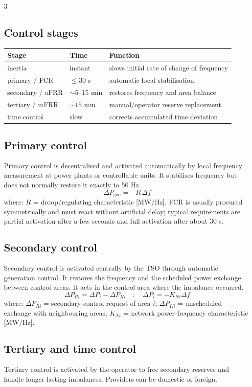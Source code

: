 \documentclass[9pt, landscape, a4paper]{article}
\begin{document}
\begin{multicols*}{3}
\subsection{Control stages}
\begin{tabularx}{\columnwidth}{@{}lXX@{}}
  \toprule
  \textbf{Stage} & \textbf{Time} & \textbf{Function}\\
  \midrule
  inertia & instant & slows initial rate of change of frequency\\
  primary / FCR & $\leq30$ s & automatic local stabilisation\\
  secondary / aFRR & $\sim5$--15 min & restores frequency and area balance\\
  tertiary / mFRR & $\sim15$ min & manual/operator reserve replacement\\
  time control & slow & corrects accumulated time deviation\\
  \bottomrule
\end{tabularx}

\subsection{Primary control}
Primary control is decentralised and activated automatically by local frequency
measurement at power plants or controllable units. It stabilises frequency but
does not normally restore it exactly to 50 Hz.
\[
  \Delta P_{\mathrm{gen}}=-R\,\Delta f
\]
where: $R$ = droop/regulating characteristic [MW/Hz]. FCR is usually procured
symmetrically and must react without artificial delay; typical requirements are
partial activation after a few seconds and full activation after about 30 s.

\subsection{Secondary control}
Secondary control is activated centrally by the TSO through automatic
generation control. It restores the frequency and the scheduled power exchange
between control areas. It acts in the control area where the imbalance occurred.
\[
  \Delta P_{Ri}=\Delta P_i-\Delta P_{Ki}
  \quad ; \quad
  \Delta P_i=-K_{Ni}\Delta f
\]
where: $\Delta P_{Ri}$ = secondary-control request of area $i$;
$\Delta P_{Ki}$ = unscheduled exchange with neighbouring areas;
$K_{Ni}$ = network power-frequency characteristic [MW/Hz].

\subsection{Tertiary and time control}
Tertiary control is activated by the operator to free secondary reserves and
handle longer-lasting imbalances. Providers can be domestic or foreign.


\end{multicols*}
\end{document}

